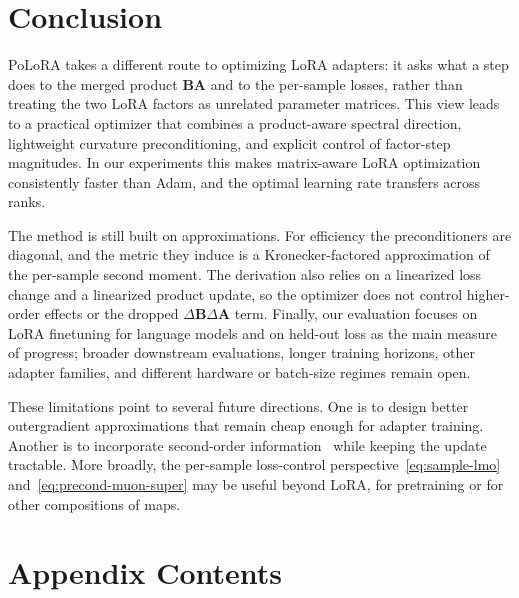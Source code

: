 \documentclass[11pt]{article}
\newcommand{\mat}[1]{\bm{#1}}
\newcommand{\methodname}{PoLoRA\xspace}
\begin{document}
\section{Conclusion}
\label{sec:conclusion}

\methodname{} takes a different route to optimizing LoRA adapters: it asks what a step does to the merged product $\mat{B}\mat{A}$ and to the per-sample losses, rather than treating the two LoRA factors as unrelated parameter matrices. This view leads to a practical optimizer that combines a product-aware spectral direction, lightweight curvature preconditioning, and explicit control of factor-step magnitudes. In our experiments this makes matrix-aware LoRA optimization consistently faster than Adam, and the optimal learning rate transfers across ranks.

The method is still built on approximations. For efficiency the preconditioners are diagonal, and the metric they induce is a Kronecker-factored approximation of the per-sample second moment. The derivation also relies on a linearized loss change and a linearized product update, so the optimizer does not control higher-order effects or the dropped $\Delta\mat{B}\Delta\mat{A}$ term. Finally, our evaluation focuses on LoRA finetuning for language models and on held-out loss as the main measure of progress; broader downstream evaluations, longer training horizons, other adapter families, and different hardware or batch-size regimes remain open.

These limitations point to several future directions. One is to design better outergradient approximations that remain cheap enough for adapter training. Another is to incorporate second-order information~\cite{du2026newtonmuonoptimizer} while keeping the update tractable. More broadly, the per-sample loss-control perspective~\eqref{eq:sample-lmo} and~\eqref{eq:precond-muon-super} may be useful beyond LoRA, for pretraining or for other compositions of maps.

\printbibliography


\clearpage
\appendix
\startcontents[app]
\section*{Appendix Contents}
\clearpage
\end{document}
